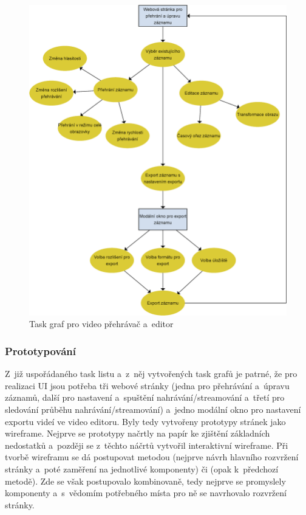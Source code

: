 \documentclass[thesis=M,czech]{FITthesis}[2012/06/26]
\begin{document}
\begin{figure}[h]\centering
	\includegraphics[width=1\textwidth]{images/ui_task_flow_2.eps}
	\caption{Task graf pro video přehrávač a~editor}\label{img:navrh_frontend_ui_taskgraf_1}
\end{figure}

\subsubsection{Prototypování} \label{subsubsec:navrh_frontend_ui_proto}
Z~již uspořádaného task listu a~z~něj vytvořených task grafů je patrné, že pro realizaci UI jsou potřeba tři webové stránky (jedna pro přehrávání a~úpravu záznamů, další pro nastavení a~spuštění nahrávání/streamování a~třetí pro sledování průběhu nahrávání/streamování) a~jedno modální okno pro nastavení exportu videí ve video editoru. Byly tedy vytvořeny prototypy stránek jako wireframe. Nejprve se prototypy načrtly na papír ke zjištění základních nedostatků a~později se z~těchto náčrtů vytvořil interaktivní wireframe. Při tvorbě wireframu se dá postupovat metodou  (nejprve návrh hlavního rozvržení stránky a~poté zaměření na jednotlivé komponenty) či  (opak k~předchozí metodě). Zde se však postupovalo kombinovaně, tedy nejprve se promyslely komponenty a~s~vědomím potřebného místa pro ně se navrhovalo rozvržení stránky. 
\end{document}

